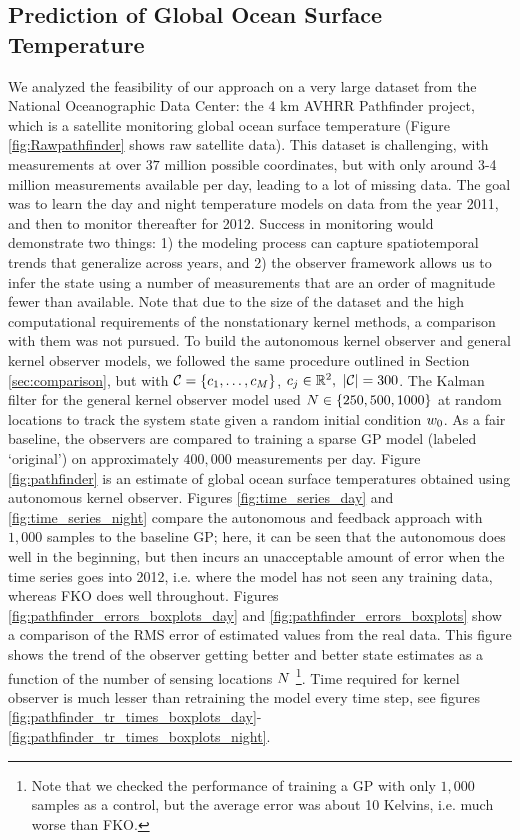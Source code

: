 \subsection{Prediction of Global Ocean Surface Temperature}\label{sec:avhhr}
We analyzed the feasibility of our approach on a very large dataset from the National Oceanographic Data Center: the $4$ km AVHRR Pathfinder project, which is a satellite monitoring global ocean surface temperature (Figure \ref{fig:Rawpathfinder} shows raw satellite data). This dataset is challenging, with measurements at over $37$ million possible coordinates, but with only around 3-4 million measurements available per day, leading to a lot of missing data. The goal was to learn the day and night temperature models on data from the year 2011, and then to monitor  thereafter for 2012. Success in monitoring would demonstrate two things: 1) the modeling process can capture spatiotemporal trends that generalize across years, and 2) the observer framework allows us to infer the state using a number of measurements that are an order of magnitude fewer than available. Note that due to the size of the dataset and the high computational requirements of the nonstationary kernel methods, a comparison with them was not pursued. To build the autonomous kernel observer and general kernel observer models, we followed the same procedure outlined in Section \ref{sec:comparison}, but with $\mathcal{C}=\{c_1,\dots,c_{M}\}$, $c_{j}\in\mathbb{R}^{2}, \ |\mathcal{C}| = 300$. The Kalman filter for the general kernel observer model  used $N \in \{250,500,1000\}$ at random locations to track the system state given a random initial condition $w_0$. As a fair baseline, the observers are compared to training a sparse GP model (labeled `original')  on approximately $400,000$ measurements per day. %
Figure \ref{fig:pathfinder} is an estimate of global ocean surface temperatures obtained using autonomous kernel observer.
Figures \ref{fig:time_series_day} and \ref{fig:time_series_night} compare the autonomous and feedback approach with $1,000$ samples to the baseline GP; here, it can be seen that the autonomous does well in the beginning, but then incurs an unacceptable amount of error when the time series goes into 2012, i.e. where the model has not seen any training data, whereas FKO does well throughout. 
Figures \ref{fig:pathfinder_errors_boxplots_day} and \ref{fig:pathfinder_errors_boxplots} show a  comparison of the RMS error of estimated values from the real data.
This figure shows the trend of the observer getting better and better state estimates as a function of the number of sensing locations $N$ \footnote{Note that we checked the performance of training a GP with only $1,000$ samples as a control, but the average error was about 10 Kelvins, i.e. much worse than FKO.}.
 Time required for kernel observer is much lesser than retraining the model every time step, see figures \ref{fig:pathfinder_tr_times_boxplots_day}-\ref{fig:pathfinder_tr_times_boxplots_night}.
 
